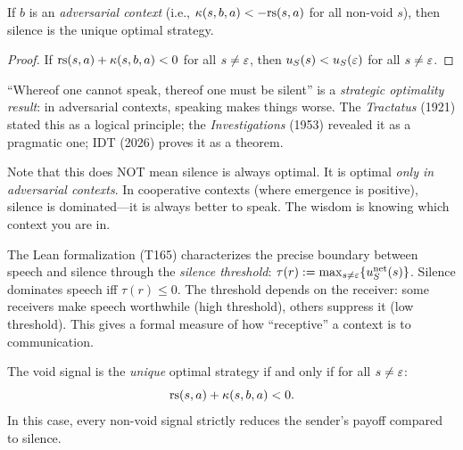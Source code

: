 \begin{theorem}
\label{thm:silence-adversarial}
If $b$ is an \emph{adversarial context} (i.e., $\kappa(s, b, a) < -\mathrm{rs}(s, a)$
for all non-void $s$), then silence is the unique optimal strategy.
\end{theorem}

\begin{proof}
If $\mathrm{rs}(s, a) + \kappa(s, b, a) < 0$ for all $s \neq \varepsilon$, then
$u_S(s) < u_S(\varepsilon)$ for all $s \neq \varepsilon$.
\end{proof}

\begin{interpretation}
``Whereof one cannot speak, thereof one must be silent'' is a
\emph{strategic optimality result}: in adversarial contexts, speaking makes
things worse. The \emph{Tractatus} (1921) stated this as a logical
principle; the \emph{Investigations} (1953) revealed it as a pragmatic one;
IDT (2026) proves it as a theorem.

Note that this does NOT mean silence is always optimal. It is optimal
\emph{only in adversarial contexts}. In cooperative contexts (where emergence
is positive), silence is dominated---it is always better to speak. The wisdom
is knowing which context you are in.
\end{interpretation}

\begin{remark}
The Lean formalization (T165) characterizes the precise boundary between
speech and silence through the \emph{silence threshold}:
$\tau(r) := \max_{s \neq \varepsilon}\{u_S^{\text{net}}(s)\}$. Silence dominates
speech iff $\tau(r) \leq 0$. The threshold depends on the receiver:
some receivers make speech worthwhile (high threshold), others suppress it
(low threshold). This gives a formal measure of how ``receptive'' a context
is to communication.
\end{remark}

\begin{theorem}
\label{thm:void-uniquely-optimal}
The void signal is the \emph{unique} optimal strategy if and only if for
all $s \neq \varepsilon$:
\[
\mathrm{rs}(s, a) + \kappa(s, b, a) < 0.
\]
In this case, every non-void signal strictly reduces the sender's payoff
compared to silence.
\end{theorem}

